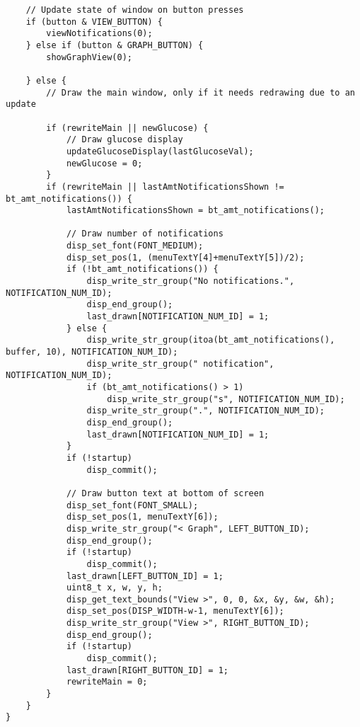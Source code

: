 \begin{enumerate}[label=\textbf{S.\arabic*},ref=S.\arabic*{ of Appendix A}]
\begin{adjustwidth}{-2em}{0pt}
\begin{lstlisting}
    // Update state of window on button presses
    if (button & VIEW_BUTTON) {
        viewNotifications(0);
    } else if (button & GRAPH_BUTTON) {
        showGraphView(0);

    } else {
        // Draw the main window, only if it needs redrawing due to an update

        if (rewriteMain || newGlucose) {
            // Draw glucose display
            updateGlucoseDisplay(lastGlucoseVal);
            newGlucose = 0;
        }
        if (rewriteMain || lastAmtNotificationsShown != bt_amt_notifications()) {
            lastAmtNotificationsShown = bt_amt_notifications();

            // Draw number of notifications
            disp_set_font(FONT_MEDIUM);
            disp_set_pos(1, (menuTextY[4]+menuTextY[5])/2);
            if (!bt_amt_notifications()) {
                disp_write_str_group("No notifications.", NOTIFICATION_NUM_ID);
                disp_end_group();
                last_drawn[NOTIFICATION_NUM_ID] = 1;
            } else {
                disp_write_str_group(itoa(bt_amt_notifications(), buffer, 10), NOTIFICATION_NUM_ID);
                disp_write_str_group(" notification", NOTIFICATION_NUM_ID);
                if (bt_amt_notifications() > 1)
                    disp_write_str_group("s", NOTIFICATION_NUM_ID);
                disp_write_str_group(".", NOTIFICATION_NUM_ID);
                disp_end_group();
                last_drawn[NOTIFICATION_NUM_ID] = 1;
            }
            if (!startup)
                disp_commit();

            // Draw button text at bottom of screen
            disp_set_font(FONT_SMALL);
            disp_set_pos(1, menuTextY[6]);
            disp_write_str_group("< Graph", LEFT_BUTTON_ID);
            disp_end_group();
            if (!startup)
                disp_commit();
            last_drawn[LEFT_BUTTON_ID] = 1;
            uint8_t x, w, y, h;
            disp_get_text_bounds("View >", 0, 0, &x, &y, &w, &h);
            disp_set_pos(DISP_WIDTH-w-1, menuTextY[6]);
            disp_write_str_group("View >", RIGHT_BUTTON_ID);
            disp_end_group();
            if (!startup)
                disp_commit();
            last_drawn[RIGHT_BUTTON_ID] = 1;
            rewriteMain = 0;
        }
    }
}
\end{lstlisting}
\end{adjustwidth}
\doublespacing


\end{enumerate}
